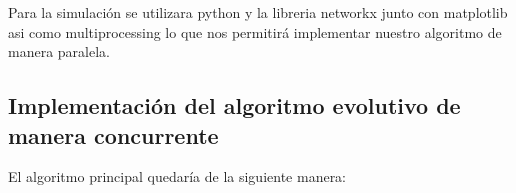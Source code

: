 \documentclass{article}
\begin{document}
Para la simulación se utilizara python y la libreria networkx junto con matplotlib asi como multiprocessing lo que nos permitirá implementar nuestro algoritmo de manera paralela.
\newpage 
\subsection{Implementación del algoritmo evolutivo de manera concurrente}
El algoritmo principal quedaría de la siguiente manera: 
\begin{figure}[H]
    \centering
    \quad

\end{figure}
\end{document}
